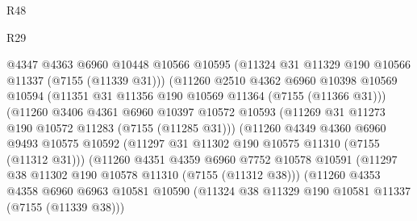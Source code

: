 \begin{lexlean}{R48}
\begin{lexlean}{R29}
\begin{coremodule}
{{{{{{{{{{{{{{{{{{{{{{{{{{{{{{{{{{{{{{{{{{{{{{{{{{{{{{{{{{{{{{{{{{{{{{{{{{{{{{{{{{{{{{{{{{{{{{{{{{{{{{{{{{{{{{{{{{{{{{{{{{{{{{{{{{{{{{{{{{{{{{{{{{{{{{{{{{{{{{{{{{{{{{{{{{{{{{{{{{{{{{{{{{{{{{{{{{{{{{{{{{{{{{{{{{{{{{{{{{                                @4347
                                @4363
                                @6960
                                @10448
                                @10566
                                @10595
                                (@11324 @31 @11329 @190 @10566 @11337 (@7155 (@11339 @31)))
                                (@11260
                                  @2510
                                  @4362
                                  @6960
                                  @10398
                                  @10569
                                  @10594
                                  (@11351 @31 @11356 @190 @10569 @11364 (@7155 (@11366 @31)))
                                  (@11260
                                    @3406
                                    @4361
                                    @6960
                                    @10397
                                    @10572
                                    @10593
                                    (@11269 @31 @11273 @190 @10572 @11283 (@7155 (@11285 @31)))
                                    (@11260
                                      @4349
                                      @4360
                                      @6960
                                      @9493
                                      @10575
                                      @10592
                                      (@11297 @31 @11302 @190 @10575 @11310 (@7155 (@11312 @31)))
                                      (@11260
                                        @4351
                                        @4359
                                        @6960
                                        @7752
                                        @10578
                                        @10591
                                        (@11297 @38 @11302 @190 @10578 @11310 (@7155 (@11312 @38)))
                                        (@11260
                                          @4353
                                          @4358
                                          @6960
                                          @6963
                                          @10581
                                          @10590
                                          (@11324
                                            @38
                                            @11329
                                            @190
                                            @10581
                                            @11337
                                            (@7155 (@11339 @38)))
}}}}}}}}}}}}}}}}}}}}}}}}}}}}}}}}}}}}}}}}}}}}}}}}}}}}}}}}}}}}}}}}}}}}}}}}}}}}}}}}}}}}}}}}}}}}}}}}}}}}}}}}}}}}}}}}}}}}}}}}}}}}}}}}}}}}}}}}}}}}}}}}}}}}}}}}}}}}}}}}}}}}}}}}}}}}}}}}}}}}}}}}}}}}}}}}}}}}}}}}}}}}}}}}}}}}}}}}}}
\end{coremodule}
\end{lexlean}
\end{lexlean}

